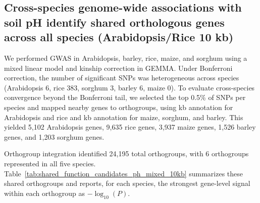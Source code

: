 \subsection{Cross-species genome-wide associations with soil pH identify shared orthologous genes across all species (Arabidopsis/Rice 10 kb)}

We performed GWAS in Arabidopsis, barley, rice, maize, and sorghum using a mixed linear model and kinship correction in GEMMA. Under Bonferroni correction, the number of significant SNPs was heterogeneous across species (Arabidopsis 6, rice 383, sorghum 3, barley 6, maize 0). To evaluate cross-species convergence beyond the Bonferroni tail, we selected the top 0.5\% of SNPs per species and mapped nearby genes to orthogroups, using  kb annotation for Arabidopsis and rice and  kb annotation for maize, sorghum, and barley. This yielded 5,102 Arabidopsis genes, 9,635 rice genes, 3,937 maize genes, 1,526 barley genes, and 1,203 sorghum genes.

Orthogroup integration identified 24,195 total orthogroups, with 6 orthogroups represented in all five species. Table~\ref{tab:shared_function_candidates_ph_mixed_10kb} summarizes these shared orthogroups and reports, for each species, the strongest gene-level signal within each orthogroup as $-\log_{10}(P)$.


